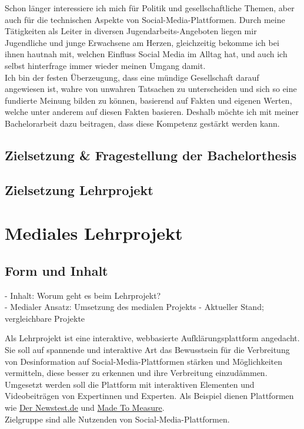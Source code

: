 \documentclass[12pt,a4paper]{article}        %
\begin{document}
Schon länger interessiere ich mich für Politik und gesellschaftliche Themen, aber auch für die technischen Aspekte von Social-Media-Plattformen. Durch meine Tätigkeiten als Leiter in diversen Jugendarbeits-Angeboten liegen mir Jugendliche und junge Erwachsene am Herzen, gleichzeitig bekomme ich bei ihnen hautnah mit, welchen Einfluss Social Media im Alltag hat, und auch ich selbst hinterfrage immer wieder meinen Umgang damit. \\
Ich bin der festen Überzeugung, dass eine mündige Gesellschaft darauf angewiesen ist, wahre von unwahren Tatsachen zu unterscheiden und sich so eine fundierte Meinung bilden zu können, basierend auf Fakten und eigenen Werten, welche unter anderem auf diesen Fakten basieren. Deshalb möchte ich mit meiner Bachelorarbeit dazu beitragen, dass diese Kompetenz gestärkt werden kann.

\subsection{Zielsetzung \& Fragestellung der Bachelorthesis}
\subsection{Zielsetzung Lehrprojekt}
\section{Mediales Lehrprojekt}
\subsection{Form und Inhalt}
- Inhalt: Worum geht es beim Lehrprojekt?\\
- Medialer Ansatz: Umsetzung des medialen Projekts
- Aktueller Stand; vergleichbare Projekte

Als Lehrprojekt ist eine interaktive, webbasierte Aufklärungsplattform angedacht. Sie soll auf spannende und interaktive Art das Bewusstsein für die Verbreitung von Desinformation auf Social-Media-Plattformen stärken und Möglichkeiten vermitteln, diese besser zu erkennen und ihre Verbreitung einzudämmen.\\
Umgesetzt werden soll die Plattform mit interaktiven Elementen und Videobeiträgen von Expertinnen und Experten. Als Beispiel dienen Plattformen wie \href{https://www.der-newstest.de}{Der Newstest.de} und \href{https://madetomeasure.online/de/}{Made To Measure}.\\
Zielgruppe sind alle Nutzenden von Social-Media-Plattformen.
\end{document}
